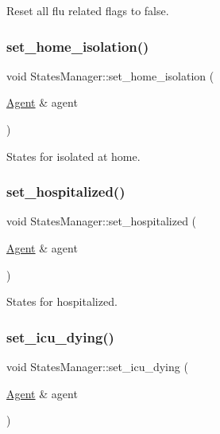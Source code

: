 Reset all flu related flags to false. 

\mbox{\label{classStatesManager_a5660eb874c13cabb0af244f8c6768685}} 
\subsubsection{\texorpdfstring{set\+\_\+home\+\_\+isolation()}{set\_home\_isolation()}}
{\footnotesize\ttfamily void States\+Manager\+::set\+\_\+home\+\_\+isolation (\begin{DoxyParamCaption}\item[{\hyperlink{classAgent}{Agent} \&}]{agent }\end{DoxyParamCaption})}



States for isolated at home. 

\mbox{\label{classStatesManager_a266757d7944ac2a13ec122e563fcfd0d}} 
\subsubsection{\texorpdfstring{set\+\_\+hospitalized()}{set\_hospitalized()}}
{\footnotesize\ttfamily void States\+Manager\+::set\+\_\+hospitalized (\begin{DoxyParamCaption}\item[{\hyperlink{classAgent}{Agent} \&}]{agent }\end{DoxyParamCaption})}



States for hospitalized. 

\mbox{\label{classStatesManager_a2044045b6b2adc1a94b5d02f72272cb7}} 
\subsubsection{\texorpdfstring{set\+\_\+icu\+\_\+dying()}{set\_icu\_dying()}}
{\footnotesize\ttfamily void States\+Manager\+::set\+\_\+icu\+\_\+dying (\begin{DoxyParamCaption}\item[{\hyperlink{classAgent}{Agent} \&}]{agent }\end{DoxyParamCaption})}



